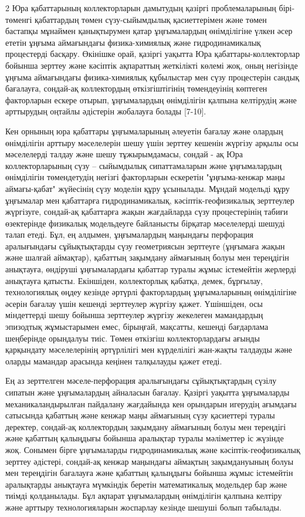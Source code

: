 \begin{multicols}{2}
Юра қабаттарының коллекторларын дамытудың қазіргі проблемаларының
бірі-төменгі қабаттардың төмен сүзу-сыйымдылық қасиеттерімен және төмен
бастапқы мұнаймен қанықтырумен қатар ұңғымалардың өнімділігіне үлкен
әсер ететін ұңғыма аймағындағы физика-химиялық және гидродинамикалық
процестерді басқару. Өкінішке орай, қазіргі уақытта Юра
қабаттары-коллекторлар бойынша зерттеу және кәсіптік ақпараттың
жеткілікті көлемі жоқ, оның негізінде ұңғыма аймағындағы физика-химиялық
құбылыстар мен сүзу процестерін сандық бағалауға, сондай-ақ коллектордың
өткізгіштігінің төмендеуінің көптеген факторларын ескере отырып,
ұңғымалардың өнімділігін қалпына келтірудің және арттырудың оңтайлы
әдістерін жобалауға болады {[}7-10{]}.

Кен орнының юра қабаттары ұңғымаларының әлеуетін бағалау және олардың
өнімділігін арттыру мәселелерін шешу үшін зерттеу кешенін жүргізу арқылы
осы мәселелерді талдау және шешу тұжырымдамасы, сондай - ақ Юра
коллекторларының сүзу -- сыйымдылық сипаттамаларын және ұңғымалардың
өнімділігін төмендетудің негізгі факторларын ескеретін "ұңғыма-кенжар
маңы аймағы-қабат" жүйесінің сүзу моделін құру ұсынылады. Мұндай
модельді құру ұңғымалар мен қабаттарға гидродинамикалық,
кәсіптік-геофизикалық зерттеулер жүргізуге, сондай-ақ қабаттарға жақын
жағдайларда сүзу процестерінің табиғи өзектерінде физикалық модельдеуге
байланысты бірқатар мәселелерді шешуді талап етеді. Бұл, ең алдымен,
ұңғымалардың маңындағы перфорация аралығындағы сұйықтықтарды сүзу
геометриясын зерттеуге (ұңғымаға жақын және шалғай аймақтар), қабаттың
зақымдану аймағының болуы мен тереңдігін анықтауға, өндіруші
ұңғымалардағы қабаттар туралы жұмыс істемейтін жерлерді анықтауға
қатысты. Екіншіден, коллекторлық қабатқа, демек, бұрғылау, технологиялық
өңдеу кезінде әртүрлі факторлардың ұңғымаларының өнімділігіне әсерін
бағалау үшін кешенді зерттеулер жүргізу қажет. Үшіншіден, осы
міндеттерді шешу бойынша зерттеулер жүргізу жекелеген мамандардың
эпизодтық жұмыстарымен емес, бірыңғай, мақсатты, кешенді бағдарлама
шеңберінде орындалуы тиіс. Төмен өткізгіш коллекторлардағы ағынды
қарқындату мәселелерінің әртүрлілігі мен күрделілігі жан-жақты талдауды
және оларды мамандар арасында кеңінен талқылауды қажет етеді.

Ең аз зерттелген мәселе-перфорация аралығындағы сұйықтықтардың сүзілу
сипатын және ұңғымалардың айналасын бағалау. Қазіргі уақытта ұңғымаларды
механикаландырылған пайдалану жағдайында кен орындарын игерудің ағымдағы
сатысында қабаттың және кенжар маңы аймағының сүзу қасиеттері туралы
деректер, сондай-ақ коллектордың зақымдану аймағының болуы мен тереңдігі
және қабаттың қалыңдығы бойынша аралықтар туралы мәліметтер іс жүзінде
жоқ. Сонымен бірге ұңғымаларды гидродинамикалық және
кәсіптік-геофизикалық зерттеу әдістері, сондай-ақ кенжар маңындағы
аймақтың зақымдануының болуы мен тереңдігін бағалауға және қабаттың
қалыңдығы бойынша жұмыс істемейтін аралықтарды анықтауға мүмкіндік
беретін математикалық модельдер бар және тиімді қолданылады. Бұл ақпарат
ұңғымалардың өнімділігін қалпына келтіру және арттыру технологияларын
жоспарлау кезінде шешуші болып табылады.


\end{multicols}
